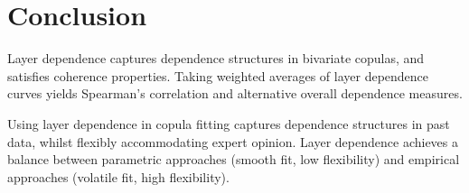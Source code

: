 \documentclass[authoryear]{elsarticle}
\begin{document}
\section{Conclusion}\label{sconclusion}

Layer dependence  captures dependence structures in bivariate copulas, and satisfies coherence properties. Taking weighted averages of layer dependence curves yields Spearman's correlation and alternative overall dependence measures.

Using layer dependence in copula fitting captures dependence structures in past data, whilst flexibly accommodating expert opinion. Layer dependence achieves a balance between parametric approaches (smooth fit, low flexibility) and empirical approaches (volatile fit, high flexibility).


\newpage

\newpage


\end{document}

